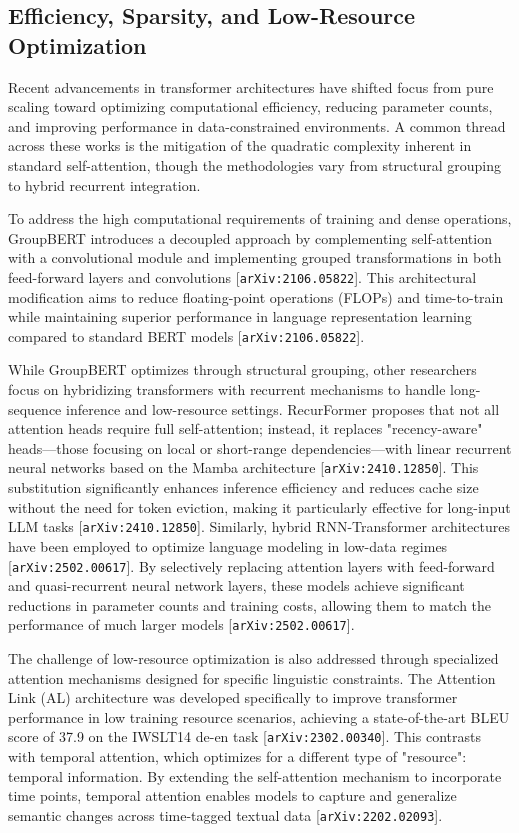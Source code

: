 \documentclass[11pt]{article}
\begin{document}
\subsection{Efficiency, Sparsity, and Low-Resource Optimization}

Recent advancements in transformer architectures have shifted focus from pure scaling toward optimizing computational efficiency, reducing parameter counts, and improving performance in data-constrained environments. A common thread across these works is the mitigation of the quadratic complexity inherent in standard self-attention, though the methodologies vary from structural grouping to hybrid recurrent integration.

To address the high computational requirements of training and dense operations, GroupBERT introduces a decoupled approach by complementing self-attention with a convolutional module and implementing grouped transformations in both feed-forward layers and convolutions [\texttt{arXiv:2106.05822}]. This architectural modification aims to reduce floating-point operations (FLOPs) and time-to-train while maintaining superior performance in language representation learning compared to standard BERT models [\texttt{arXiv:2106.05822}].

While GroupBERT optimizes through structural grouping, other researchers focus on hybridizing transformers with recurrent mechanisms to handle long-sequence inference and low-resource settings. RecurFormer proposes that not all attention heads require full self-attention; instead, it replaces "recency-aware" heads—those focusing on local or short-range dependencies—with linear recurrent neural networks based on the Mamba architecture [\texttt{arXiv:2410.12850}]. This substitution significantly enhances inference efficiency and reduces cache size without the need for token eviction, making it particularly effective for long-input LLM tasks [\texttt{arXiv:2410.12850}]. Similarly, hybrid RNN-Transformer architectures have been employed to optimize language modeling in low-data regimes [\texttt{arXiv:2502.00617}]. By selectively replacing attention layers with feed-forward and quasi-recurrent neural network layers, these models achieve significant reductions in parameter counts and training costs, allowing them to match the performance of much larger models [\texttt{arXiv:2502.00617}].

The challenge of low-resource optimization is also addressed through specialized attention mechanisms designed for specific linguistic constraints. The Attention Link (AL) architecture was developed specifically to improve transformer performance in low training resource scenarios, achieving a state-of-the-art BLEU score of 37.9 on the IWSLT14 de-en task [\texttt{arXiv:2302.00340}]. This contrasts with temporal attention, which optimizes for a different type of "resource": temporal information. By extending the self-attention mechanism to incorporate time points, temporal attention enables models to capture and generalize semantic changes across time-tagged textual data [\texttt{arXiv:2202.02093}].
\end{document}
